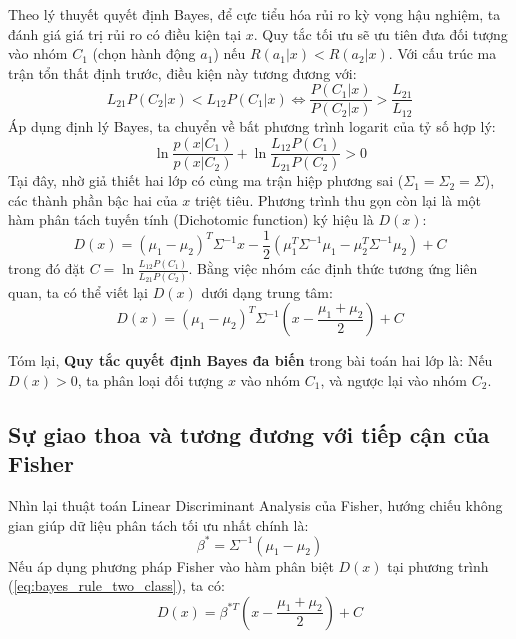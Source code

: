 Theo lý thuyết quyết định Bayes, để cực tiểu hóa rủi ro kỳ vọng hậu nghiệm, ta đánh giá giá trị rủi ro có điều kiện tại $x$. Quy tắc tối ưu sẽ ưu tiên đưa đối tượng vào nhóm $C_1$ (chọn hành động $a_1$) nếu $R(a_1|x) < R(a_2|x)$. Với cấu trúc ma trận tổn thất định trước, điều kiện này tương đương với:
\begin{equation}
    L_{21} P(C_2 | x) < L_{12} P(C_1 | x) \iff \frac{P(C_1 | x)}{P(C_2 | x)} > \frac{L_{21}}{L_{12}}
\end{equation}
Áp dụng định lý Bayes, ta chuyển về bất phương trình logarit của tỷ số hợp lý:
\begin{equation}
    \ln \frac{p(x | C_1)}{p(x | C_2)} + \ln \frac{L_{12} P(C_1)}{L_{21} P(C_2)} > 0
\end{equation}
Tại đây, nhờ giả thiết hai lớp có cùng ma trận hiệp phương sai ($\Sigma_1 = \Sigma_2 = \Sigma$), các thành phần bậc hai của $x$ triệt tiêu. Phương trình thu gọn còn lại là một hàm phân tách tuyến tính (Dichotomic function) ký hiệu là $D(x)$:
\begin{equation}
    D(x) = (\mu_1 - \mu_2)^T \Sigma^{-1} x - \frac{1}{2}\left( \mu_1^T \Sigma^{-1} \mu_1 - \mu_2^T \Sigma^{-1} \mu_2 \right) + C
\end{equation}
trong đó đặt $C = \ln \frac{L_{12} P(C_1)}{L_{21} P(C_2)}$. 
Bằng việc nhóm các định thức tương ứng liên quan, ta có thể viết lại $D(x)$ dưới dạng trung tâm:
\begin{equation}\label{eq:bayes_rule_two_class}
    D(x) = (\mu_1 - \mu_2)^T \Sigma^{-1} \left( x - \frac{\mu_1 + \mu_2}{2} \right) + C
\end{equation}

Tóm lại, \textbf{Quy tắc quyết định Bayes đa biến} trong bài toán hai lớp là: Nếu $D(x) > 0$, ta phân loại đối tượng $x$ vào nhóm $C_1$, và ngược lại vào nhóm $C_2$.

\subsection{Sự giao thoa và tương đương với tiếp cận của Fisher}

Nhìn lại thuật toán Linear Discriminant Analysis của Fisher, hướng chiếu không gian giúp dữ liệu phân tách tối ưu nhất chính là:
\begin{equation}
    \beta^* = \Sigma^{-1}(\mu_1 - \mu_2)
\end{equation}
Nếu áp dụng phương pháp Fisher vào hàm phân biệt $D(x)$ tại phương trình (\ref{eq:bayes_rule_two_class}), ta có:
\begin{equation}
    D(x) = \beta^{*T} \left( x - \frac{\mu_1 + \mu_2}{2} \right) + C
\end{equation}

